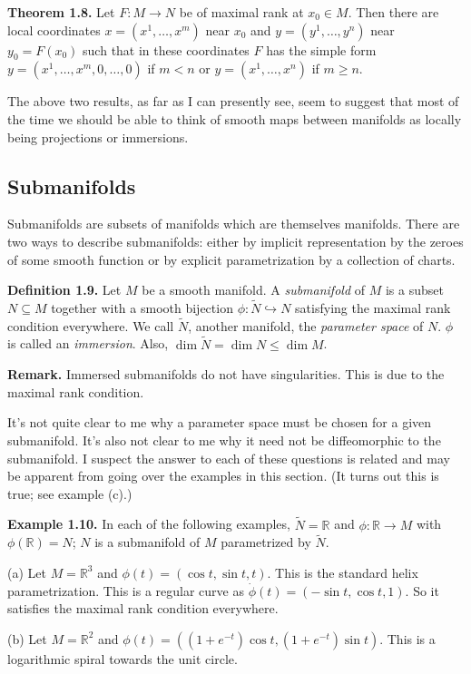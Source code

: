 \documentclass[a4paper]{article}
\newcommand{\R}{\mathbb{R}}
\begin{document}
\textbf{Theorem 1.8.} Let $F : M \to N$ be of maximal rank at $x_0 \in M$. Then there are local coordinates $x = (x^1, \ldots, x^m)$ near $x_0$ and $y = (y^1, \ldots, y^n)$ near $y_0 = F(x_0)$ such that in these coordinates $F$ has the simple form $y = (x^1, \ldots, x^m, 0, \ldots, 0)$ if $m < n$ or $y = (x^1, \ldots, x^n)$ if $m \geq n$.

The above two results, as far as I can presently see, seem to suggest that most of the time we should be able to think of smooth maps between manifolds as locally being projections or immersions.

\subsection{Submanifolds}

Submanifolds are subsets of manifolds which are themselves manifolds. There are two ways to describe submanifolds: either by implicit representation by the zeroes of some smooth function or by explicit parametrization by a collection of charts.

\textbf{Definition 1.9.} Let $M$ be a smooth manifold. A \emph{submanifold} of $M$ is a subset $N \subseteq M$ together with a smooth bijection $\phi : \tilde{N} \hookrightarrow N$ satisfying the maximal rank condition everywhere. We call $\tilde{N}$, another manifold, the \emph{parameter space} of $N$. $\phi$ is called an \emph{immersion}. Also, $\dim \tilde{N} = \dim N \leq \dim M$.

\textbf{Remark.} Immersed submanifolds do not have singularities. This is due to the maximal rank condition.

It's not quite clear to me why a parameter space must be chosen for a given submanifold. It's also not clear to me why it need not be diffeomorphic to the submanifold. I suspect the answer to each of these questions is related and may be apparent from going over the examples in this section. (It turns out this is true; see example (c).)

\textbf{Example 1.10.} In each of the following examples, $\tilde{N} = \R$ and $\phi : \R \to M$ with $\phi(\R) = N$; $N$ is a submanifold of $M$ parametrized by $\tilde{N}$.

(a) Let $M = \R^3$ and $\phi(t) = (\cos t, \sin t, t)$. This is the standard helix parametrization. This is a regular curve as $\dot{\phi}(t) = (-\sin t, \cos t, 1)$. So it satisfies the maximal rank condition everywhere.

(b) Let $M = \R^2$ and $\phi(t) = ((1 + e^{-t})\cos t, (1 + e^{-t})\sin t)$. This is a logarithmic spiral towards the unit circle.
\end{document}
